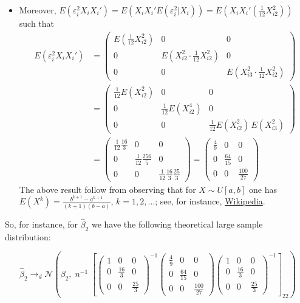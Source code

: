 \documentclass[
  letterpaper,
  DIV=11,
  numbers=noendperiod]{scrreprt}
\providecommand{\tightlist}{%
  \setlength{\itemsep}{0pt}\setlength{\parskip}{0pt}}\usepackage{longtable,booktabs,array}
\theoremstyle{definition}
\theoremstyle{plain}
\theoremstyle{plain}
\theoremstyle{remark}
\begin{document}
{\begin{itemize}
\tightlist
\item
  Moreover,
  \(E(\varepsilon^2_iX_iX_i')=E(X_iX_i'E(\varepsilon^2_i|X_i))=E\left(X_iX_i'\left(\frac{1}{12}X_{i2}^2\right)\right)\)
  such that \begin{align*}
  E(\varepsilon^2_iX_iX_i')
  &=\left(\begin{matrix}E\left(\frac{1}{12}X_{i2}^2\right)&0&0\\
                   0&E\left(X_{i2}^2\cdot\frac{1}{12}X_{i2}^2\right)&0\\0&0&E\left(X_{i3}^2\cdot\frac{1}{12}X_{i2}^2\right)
      \end{matrix}\right)\\
  &=\left(\begin{matrix}\frac{1}{12}E\left(X_{i2}^2\right)&0&0\\
       0&\frac{1}{12}E\left(X_{i2}^4\right)&0\\0&0&\frac{1}{12}E\left(X_{i2}^2\right)\,E\left(X_{i3}^2\right)
  \end{matrix}\right)\\      
  &=\left(\begin{matrix}\frac{1}{12}\frac{16}{3}&0&0\\
                      0&\frac{1}{12}\frac{256}{5}&0\\
                      0&0&\frac{1}{12}\frac{16}{3}\frac{25}{3}\end{matrix}\right)
   =\left(\begin{matrix}\frac{4}{9}&0&0\\0&\frac{64}{15}&0\\0&0&\frac{100}{27}\end{matrix}\right)
  \end{align*} The above result follow from observing that for
  \(X\sim U[a,b]\) one has
  \(E(X^k)=\frac{b^{k+1}-a^{k+1}}{(k+1)(b-a)}\), \(k=1,2,\dots\); see,
  for instance,
  \href{https://en.wikipedia.org/wiki/Continuous_uniform_distribution}{Wikipedia}.
\end{itemize}

So, for instance, for \(\hat{\beta}_2\) we have the following
theoretical large sample distribution:

\[
\hat\beta_2\to_d\mathcal{N}\left(\beta_2, \;n^{-1}\;\left[\left(\begin{matrix}1&0&0\\0&\frac{16}{3}&0\\0&0&\frac{25}{3}\end{matrix}\right)^{-1}\left(\begin{matrix}\frac{4}{9}&0&0\\0&\frac{64}{15}&0\\0&0&\frac{100}{27}\end{matrix}\right)\left(\begin{matrix}1&0&0\\0&\frac{16}{3}&0\\0&0&\frac{25}{3}\end{matrix}\right)^{-1}\right]_{22}\right)
\]

}
\end{document}
